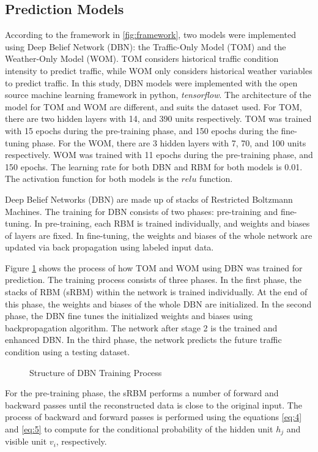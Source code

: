 \subsection{Prediction Models}
According to the framework in \ref{fig:framework}, two models were implemented using Deep Belief Network (DBN): the Traffic-Only Model (TOM) and the Weather-Only Model (WOM). TOM considers historical traffic condition intensity to predict traffic, while WOM only considers historical weather variables to predict traffic. In this study, DBN models were implemented with the open source machine learning framework in python, \textit{tensorflow}. The architecture of the model for TOM and WOM are different, and suits the dataset used. For TOM, there are two hidden layers with 14, and 390 units respectively. TOM was trained with 15 epochs during the pre-training phase, and 150 epochs during the fine-tuning phase. For the WOM, there are 3 hidden layers with 7, 70, and 100 units respectively. WOM was trained with 11 epochs during the pre-training phase, and 150 epochs. The learning rate for both DBN and RBM for both models is 0.01. The activation function for both models is the $relu$ function. 

Deep Belief Networks (DBN) are  made up of stacks of Restricted Boltzmann Machines. The training for DBN consists of two phases: pre-training and fine-tuning. In pre-training, each RBM is trained individually, and weights and biases of layers are fixed. In fine-tuning, the weights and biases of the whole network are updated via back propagation using labeled input data. 

Figure \ref{fig:dbntraining} shows the process of how TOM and WOM using DBN was trained for prediction. The training process consists of three phases. In the first phase, the stacks of RBM (sRBM) within the network is  trained individually. At the end of this phase, the weights and biases of the whole DBN are initialized. In the second phase, the DBN fine tunes the initialized weights and biases using backpropagation algorithm. The network after stage 2 is the trained and enhanced DBN. In the third phase, the network predicts the future traffic condition using a testing dataset.

\begin{figure}[h]
	\centering
	\captionsetup{justification=centering}
	\caption{Structure of DBN Training Process}
	\label{fig:dbntraining}
\end{figure}

For the pre-training phase, the sRBM performs a number of forward and backward passes until the reconstructed data is close to the original input. The process of backward and forward passes is performed using the equations \ref{eq:4} and \ref{eq:5} to compute for the conditional probability of the hidden unit $h_j$ and visible unit $v_i$, respectively. 

